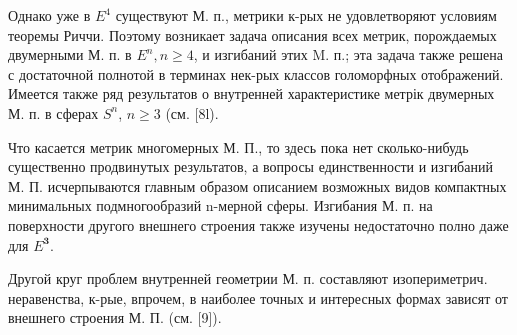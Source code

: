 \documentclass[10pt]{article}
\begin{document}
Однако уже в $E^{4}$ существуют М. п., метрики к-рых не удовлетворяют условиям теоремы Риччи. Поэтому возникает задача описания всех метрик, порождаемых двумерными М. п. в $E^{n}, n \geqslant 4$, и изгибаний этих M. п.; эта задача также решена с достаточной полнотой в терминах нек-рых классов голоморфных отображений. Имеется также ряд результатов о внутренней характеристике метрік двумерных М. п. в сферах $S^{n}$, $n \geqslant 3$ (см. [8l).



Что касается метрик многомерных М. П., то здесь пока нет сколько-нибудь существенно продвинутых результатов, а вопросы единственности и изгибаний М. П. исчерпываются главным образом описанием возможных видов компактных минимальных подмногообразий n-мерной сферы. Изгибания М. п. на поверхности другого внешнего строения также изучены недостаточно полно даже для $E^{\mathbf{3}}$.



Другой круг проблем внутренней геометрии М. п. составляют изопериметрич. неравенства, к-рые, впрочем, в наиболее точных и интересных формах зависят от внешнего строения М. П. (см. [9]).
\end{document}
